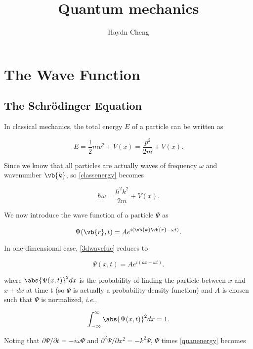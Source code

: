 \documentclass[a4paper,12pt]{report}
\title{Quantum mechanics}
\author{Haydn Cheng}
\date{}
\begin{document}
\maketitle
\tableofcontents
	
\chapter{The Wave Function}
	
\section{The Schrödinger Equation}
	
In classical mechanics, the total energy \(E\) of a particle can be written as 


\begin{equation}
  E=\frac{1}{2} mv^2 + V(x) = \frac{p^2}{2m} + V(x). \label{classenergy}
\end{equation}

Since we know that all particles are actually waves of frequency \(\omega\) and wavenumber \(\vb{k}\), so \cref{classenergy} becomes

\begin{equation} 
  \hbar \omega = \frac{\hbar^2k^2}{2m} + V(x). \label{quanenergy}
\end{equation}

We now introduce the wave function of a particle \(\Psi \) as

\begin{equation}
  \Psi (\vb{r} ,t) = Ae^{i(\vb{k} \dot{\vb{r} } - \omega t )}. \label{3dwavefuc} 
\end{equation}

In one-dimensional case, \cref{3dwavefuc} reduces to

\begin{equation}
  \Psi (x,t) = Ae^{i(kx - \omega t)}. \label{1dwavefuc}  
\end{equation}

where \(\abs{\Psi (x,t)}^2 dx\) is the probability of finding the particle between \(x\) and \(x + dx\) at time t (so \(\Psi\) is actually a probability density function) and \(A\) is chosen such that \(\Psi\) is normalized, \textit{i.e.,} 

\begin{equation}
  \int_{-\infty}^{\infty} \abs{\Psi (x,t)}^2 dx = 1.
\end{equation}

Noting that \( \partial \Psi /\partial t = -i \omega\Psi \) and \( \partial ^2\Psi /\partial x^2 = -k^2\Psi \), \(\Psi\) times \cref{quanenergy} becomes
\end{document}

